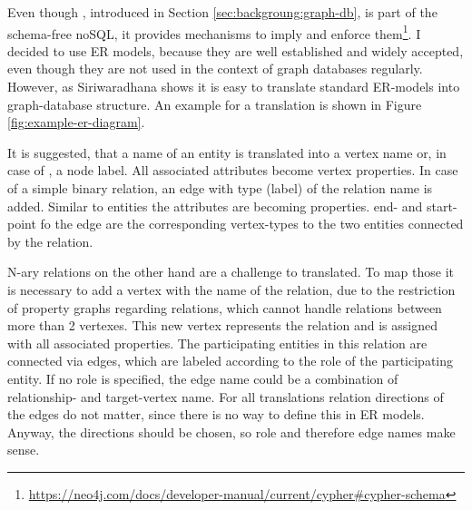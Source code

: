 Even though \neoj, introduced in Section \ref{sec:backgroung:graph-db}, is part of the schema-free noSQL, it provides mechanisms to imply and enforce them\footnote{\url{https://neo4j.com/docs/developer-manual/current/cypher\#cypher-schema}}.
I decided to use ER models, because they are well established and widely accepted, even though they are not used in the context of graph databases regularly.
However, as Siriwaradhana shows it is easy to translate standard ER-models into graph-database structure. \cite{Siriwaradhana2014}
An example for a translation is shown in Figure \ref{fig:example-er-diagram}.

It is suggested, that a name of an entity is translated into a vertex name or, in case of \neoj, a node label. All associated attributes become vertex properties.
In case of a simple binary relation, an edge with type (\neoj label) of the relation name is added. Similar to entities the attributes are becoming properties. end- and start-point fo the edge are the corresponding vertex-types to the two entities connected by the relation.

N-ary relations on the other hand are a challenge to translated. To map those it is necessary to add a vertex with the name of the relation, due to the restriction of property graphs regarding relations, which cannot handle relations between more than 2 vertexes.
This new vertex represents the relation and is assigned with all associated properties. The participating entities in this relation are connected via edges, which are labeled according to the role of the participating entity. If no role is specified, the edge name could be a combination of relationship- and target-vertex name.
For all translations relation directions of the edges do not matter, since there is no way to define this in ER models. Anyway, the directions should be chosen, so role and therefore edge names make sense.


